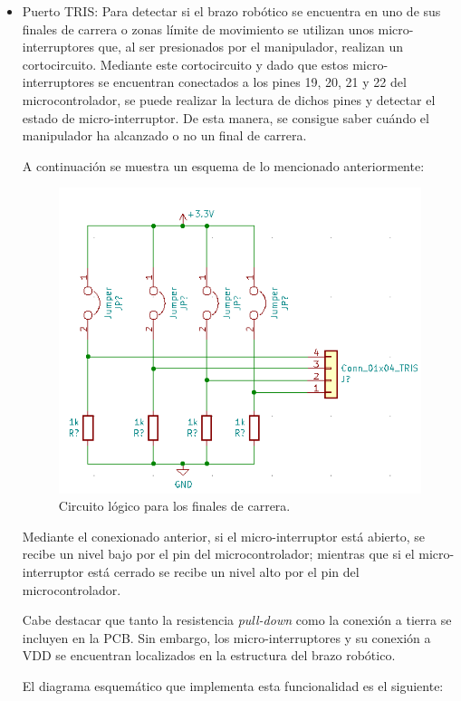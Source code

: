 \begin{itemize}
    \item Puerto TRIS:  Para detectar si el brazo robótico se encuentra en uno de sus finales de carrera o zonas límite de movimiento se utilizan unos micro-interruptores que, al ser presionados por el manipulador, realizan un cortocircuito. Mediante este cortocircuito y dado que estos micro-interruptores se encuentran conectados a los pines 19, 20, 21 y 22 del microcontrolador, se puede realizar la lectura de dichos pines y detectar el estado de micro-interruptor. De esta manera, se consigue saber cuándo el manipulador ha alcanzado o no un final de carrera.
    
    A continuación se muestra un esquema de lo mencionado anteriormente:
    
    \begin{figure}[H]
    \centering 
    \includegraphics[width=.64\linewidth]{pictures/MicroSwitchesSchematic.PNG}
    \caption{Circuito lógico para los finales de carrera.}
    \label{fig:CAMBIAR!!!!!!!!!!}
    \end{figure}
    
    Mediante el conexionado anterior, si el micro-interruptor está abierto, se recibe un nivel bajo por el pin del microcontrolador; mientras que si el micro-interruptor está cerrado se recibe un nivel alto por el pin del microcontrolador. 
    
    Cabe destacar que tanto la resistencia \textit{pull-down} como la conexión a tierra se incluyen en la \ac{PCB}. Sin embargo, los micro-interruptores y su conexión a VDD se encuentran localizados en la estructura del brazo robótico. 
    
    El diagrama esquemático que implementa esta funcionalidad es el siguiente:
    

\end{itemize}
